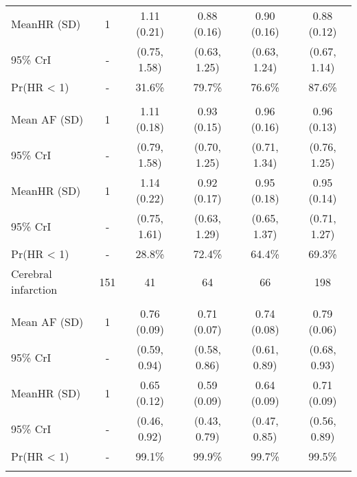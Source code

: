 \documentclass[nutrients,article,submit,moreauthors,pdftex]{mdpi}
\begin{document}
\begin{table}[!h]
{\begin{tabular}[t]{lccccc}
\rowcolor{gray!6}  \hspace{1em}MeanHR (SD) & 1 & 1.11 (0.21) & 0.88 (0.16) & 0.90 (0.16) & 0.88 (0.12)\\
\hspace{1em}95\% CrI & - & (0.75, 1.58) & (0.63, 1.25) & (0.63, 1.24) & (0.67, 1.14)\\
\rowcolor{gray!6}  \hspace{1em}Pr(HR < 1) & - & 31.6\% & 79.7\% & 76.6\% & 87.6\%\\
\addlinespace[0.3em]
\multicolumn{6}{l}{\textbf{Model 2}}\\
\hspace{1em}Mean AF (SD) & 1 & 1.11 (0.18) & 0.93 (0.15) & 0.96 (0.16) & 0.96 (0.13)\\
\rowcolor{gray!6}  \hspace{1em}95\% CrI & - & (0.79, 1.58) & (0.70, 1.25) & (0.71, 1.34) & (0.76, 1.25)\\
\hspace{1em}MeanHR (SD) & 1 & 1.14 (0.22) & 0.92 (0.17) & 0.95 (0.18) & 0.95 (0.14)\\
\rowcolor{gray!6}  \hspace{1em}95\% CrI & - & (0.75, 1.61) & (0.63, 1.29) & (0.65, 1.37) & (0.71, 1.27)\\
\hspace{1em}Pr(HR < 1) & - & 28.8\% & 72.4\% & 64.4\% & 69.3\%\\
\hline
\rowcolor{gray!6}  Cerebral infarction & 151 & 41 & 64 & 66 & 198\\
\addlinespace[0.3em]
\multicolumn{6}{l}{\textbf{Model 0}}\\
\hspace{1em}Mean AF (SD) & 1 & 0.76 (0.09) & 0.71 (0.07) & 0.74 (0.08) & 0.79 (0.06)\\
\rowcolor{gray!6}  \hspace{1em}95\% CrI & - & (0.59, 0.94) & (0.58, 0.86) & (0.61, 0.89) & (0.68, 0.93)\\
\hspace{1em}MeanHR (SD) & 1 & 0.65 (0.12) & 0.59 (0.09) & 0.64 (0.09) & 0.71 (0.09)\\
\rowcolor{gray!6}  \hspace{1em}95\% CrI & - & (0.46, 0.92) & (0.43, 0.79) & (0.47, 0.85) & (0.56, 0.89)\\
\hspace{1em}Pr(HR < 1) & - & 99.1\% & 99.9\% & 99.7\% & 99.5\%\\
\addlinespace[0.3em]
\multicolumn{6}{l}{\textbf{Model 1}}\\

\end{tabular}}
\end{table}
\end{document}
